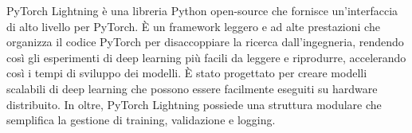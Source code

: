 \begin{figure}  %
    \setlength{\fboxsep}{2pt} %
    \setlength{\fboxrule}{0pt} %
\end{figure}

PyTorch Lightning \cite{PyTorchLightning, PyTorchLightning_site} è una libreria Python 
open-source che fornisce un'interfaccia di 
alto livello per PyTorch. È un framework leggero e ad alte prestazioni che 
organizza il codice PyTorch per disaccoppiare la ricerca dall'ingegneria, rendendo 
così gli esperimenti di deep learning più facili da leggere e riprodurre,
accelerando così i tempi di sviluppo dei modelli. 
È stato progettato per creare modelli scalabili di deep learning che possono 
essere facilmente eseguiti su hardware distribuito.
In oltre, PyTorch Lightning possiede una struttura modulare che semplifica 
la gestione di training, validazione e logging.
\aftergroup
\par